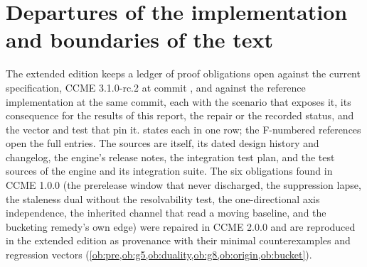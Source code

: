 \section{Departures of the implementation and boundaries of the text}
\label{sec:departures}

The extended edition keeps a ledger of proof obligations open against the
current specification, CCME 3.1.0-rc.2 at commit , and against
the reference implementation at the same commit, each with the scenario that
exposes it, its consequence for the results of this report, the repair or the
recorded status, and the vector and test that pin it. 
states each in one row; the F-numbered references open the full entries. The
sources are \SPEC{} itself, its dated design history and changelog, the
engine's release notes, the integration test plan, and the test sources of
the engine and its integration suite. The six obligations found in CCME 1.0.0
(the prerelease window that never discharged, the suppression lapse, the
staleness dual without the resolvability test, the one-directional axis
independence, the inherited channel that read a moving baseline, and the
bucketing remedy's own edge) were repaired in CCME 2.0.0 and are reproduced
in the extended edition as provenance with their minimal counterexamples and
regression vectors (\cref{ob:pre,ob:g5,ob:duality,ob:g8,ob:origin,ob:bucket}).


